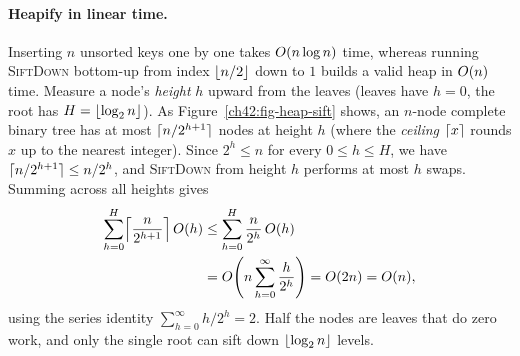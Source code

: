 \paragraph{Heapify in linear time.} Inserting $n$ unsorted keys one by one takes $O(n\log n)$ time, whereas running \textsc{SiftDown} bottom-up from index $\lfloor n/2\rfloor$ down to $1$ builds a valid heap in $O(n)$ time. Measure a node's \emph{height} $h$ upward from the leaves (leaves have $h=0$, the root has $H = \lfloor\log_2 n\rfloor$). As Figure~\ref{ch42:fig-heap-sift} shows, an $n$-node complete binary tree has at most $\lceil n/2^{h+1}\rceil$ nodes at height $h$ (where the \emph{ceiling} $\lceil x\rceil$ rounds $x$ up to the nearest integer). Since $2^h \le n$ for every $0 \le h \le H$, we have $\lceil n/2^{h+1}\rceil \le n/2^h$, and \textsc{SiftDown} from height $h$ performs at most $h$ swaps. Summing across all heights gives
\begin{align*}
  \sum_{h=0}^{H} \ceil*{\frac{n}{2^{h+1}}}\, \Oh(h)
  &\le \sum_{h=0}^{H} \frac{n}{2^h}\, \Oh(h) \\
  &= \Oh\!\left(n \sum_{h=0}^{\infty} \frac{h}{2^h}\right)
  = \Oh(2n) = \Oh(n),
\end{align*}
using the series identity $\sum_{h=0}^{\infty} h/2^h = 2$. Half the nodes are leaves that do zero work, and only the single root can sift down $\lfloor\log_2 n\rfloor$ levels.


